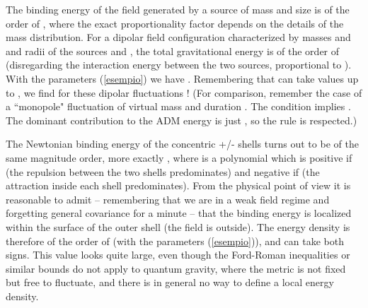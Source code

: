 \documentclass[a4paper,11pt]{article}
\begin{document}
The binding energy of the 
field generated by a source of mass \coordHE{} and size
\coordHE{} is of the order of \coordHE{}, where
the exact proportionality factor depends on the details
of the mass distribution. 
For a dipolar field configuration characterized by
masses \coordHE{} and \coordHE{} 
and radii of the sources \coordHE{} and \coordHE{},
the total gravitational energy is of the order of
\coordHE{}
(disregarding the interaction energy between the two
sources, proportional to \coordHE{}).
With the parameters (\ref{esempio}) we have 
\coordHE{}. Remembering that 
\coordHE{} can take values up to \coordHE{},
we find for these dipolar fluctuations \coordHE{}! (For comparison, remember the case of a
``monopole" fluctuation of virtual mass \coordHE{} and duration \myHighlight{$\tau$}\coordHE{}. The 
condition \coordHE{} implies \coordHE{}. The dominant contribution
to the ADM energy is just \coordHE{}, so the rule \coordHE{} is
respected.)

The Newtonian binding energy of the concentric +/- shells
turns out to be of the same magnitude order, more exactly
\coordHE{},
where \coordHE{} is a polynomial which 
is positive
if \coordHE{} (the repulsion between the two shells
predominates) and negative if \coordHE{} (the 
attraction inside each shell predominates).
From the physical point of view it is reasonable
to admit -- remembering that we are in a weak field regime
and forgetting general covariance for a minute -- that
the binding energy is localized within the surface of
the outer shell (the field is \coordHE{} outside). The
energy density is therefore of the order of
\coordHE{} (with the parameters (\ref{esempio})), and can take both
signs. This value looks quite large, even though the
Ford-Roman inequalities \cite{for} or similar bounds do
not apply to quantum gravity, where the metric is not 
fixed but free to fluctuate, and there is in general no 
way to define a local energy density.
\end{document}
